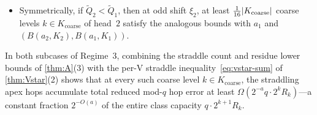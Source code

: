 \begin{theorem}
\begin{enumerate}
\begin{itemize}
    \begin{align*}
      \lean{classStraddleCount}(s_0, m, k, \kappa, \mathrm{true}, \xi_1) &\;\ge\; \frac{2^{k+2} R_k}{2^{a_2 + 7}}, \\
      \bigl(2 A^{(1)}_k + 2(c_{\sigf}^{(2)}(\kappa) - c_{\sigb}^{(2)}(\kappa))\bigr) \bmod q &\;\ge\; \frac{q}{2}.
    \end{align*}
  \item Symmetrically, if $\tilde{Q}_2 < \tilde{Q}_1$, then at odd shift $\xi_2$, at least
    $\tfrac{1}{16}\lvert K_{\mathrm{coarse}} \rvert$ coarse levels $k \in K_{\mathrm{coarse}}$ of head~$2$ satisfy the analogous
    bounds with $a_1$ and $(B(a_2, K_2), B(a_1, K_1))$.
  \end{itemize}
\end{enumerate}
\end{theorem}

In both subcases of Regime~3, combining the straddle count and residue lower bounds of \cref{thm:A}(3) with the per-V
straddle inequality~\eqref{eq:vstar-sum} of \cref{thm:Vstar}(2) shows that at every such coarse level $k \in K_{\mathrm{coarse}}$,
the straddling apex hops accumulate total reduced mod-$q$ hop error at least $\Omega(2^{-a} q \cdot 2^k R_k)$---a constant
fraction $2^{-O(a)}$ of the entire class capacity $q \cdot 2^{k+1} R_k$.

